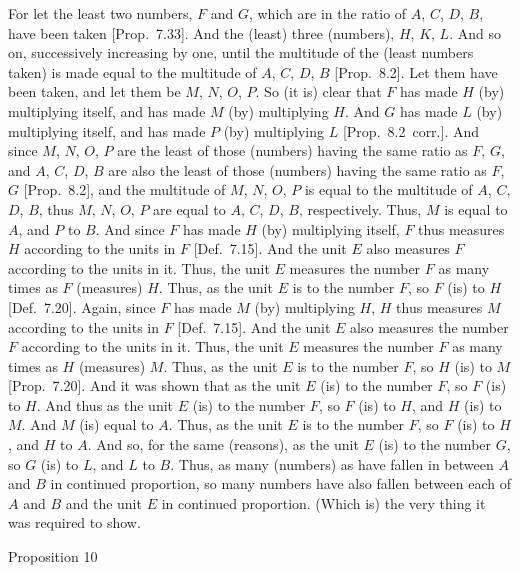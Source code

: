 For let the least two numbers, $F$ and $G$, which are in the
ratio of $A$, $C$, $D$, $B$, have been taken [Prop.~7.33]. And the (least) three (numbers), $H$, $K$, $L$. And so on, successively increasing by one, until the multitude
of the (least numbers taken) is made  equal to the multitude of $A$, $C$, $D$, $B$
[Prop.~8.2]. Let them have been taken, and let
them be $M$, $N$, $O$, $P$. So (it is) clear that $F$ has made $H$ (by)
multiplying itself, and has made $M$ (by) multiplying $H$. And $G$
has made $L$ (by) multiplying itself, and has made $P$ (by) multiplying $L$
[Prop.~8.2~corr.]. And since $M$, $N$, $O$, $P$
are the least of those (numbers) having the same ratio as $F$, $G$, and
$A$, $C$, $D$, $B$ are also the least of those (numbers) having the
same ratio as $F$, $G$ [Prop.~8.2], and the multitude
of $M$, $N$, $O$, $P$ is equal to the multitude of $A$, $C$, $D$, $B$, thus
$M$, $N$, $O$, $P$ are  equal to  $A$, $C$, $D$, $B$, respectively. 
Thus, $M$ is equal to $A$, and $P$ to $B$. And since $F$ has made
$H$ (by) multiplying itself, $F$ thus measures $H$ according to the
units in $F$ [Def.~7.15].  And the unit $E$ also
measures $F$ according to the units in it. Thus, the unit $E$
measures the number $F$ as many times as $F$ (measures) $H$. Thus,
as the unit $E$ is to the number $F$, so $F$ (is) to $H$ [Def.~7.20]. Again, since $F$ has made $M$ (by)
multiplying $H$, $H$ thus measures $M$ according to the units in $F$
 [Def.~7.15].  And the unit $E$ also measures
 the number $F$ according to the units in it. Thus, the unit $E$ measures
 the number $F$ as many times as $H$ (measures) $M$. Thus,
 as the unit $E$ is to the number $F$, so $H$ (is) to $M$ [Prop.~7.20]. And it was shown
 that as the unit $E$ (is) to the number $F$, so $F$ (is) to $H$. And thus
 as the unit $E$ (is) to the number $F$, so $F$ (is) to $H$, and $H$ (is)
 to $M$. And $M$ (is) equal to $A$. Thus, as the unit $E$ is to the number
 $F$, so $F$ (is) to $H$, and $H$ to $A$. And so, for the same (reasons),
 as the unit $E$ (is) to the number $G$, so $G$ (is) to $L$, and $L$ to
 $B$.  Thus, as many  (numbers)  as have fallen
 in between $A$ and $B$  in continued proportion,  so many numbers  have also fallen between each of $A$ and $B$ and the unit 
 $E$ in continued proportion. (Which is) the very thing it was required to show. 


\begin{center}
{\large Proposition 10}
\end{center}

